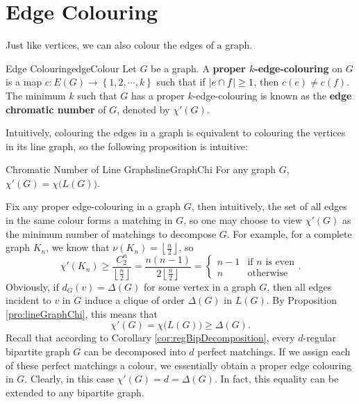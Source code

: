 \documentclass[math, code]{amznotes}
\theoremstyle{remark}
\begin{document}
\section{Edge Colouring}
Just like vertices, we can also colour the edges of a graph. 
\begin{dfnbox}{Edge Colouring}{edgeColour}
    Let $G$ be a graph. A {\color{red} \textbf{proper $k$-edge-colouring}} on $G$ is a map $c \colon E(G) \to \left\{1, 2, \cdots, k\right\}$ such that if ${\left\lvert {e \cap f} \right\rvert} \geq 1$, then $c(e) \neq c(f)$. The minimum $k$ such that $G$ has a proper $k$-edge-colouring is known as the {\color{red} \textbf{edge chromatic number}} of $G$, denoted by $\chi'(G)$.
\end{dfnbox}
Intuitively, colouring the edges in a graph is equivalent to colouring the vertices in its line graph, so the following proposition is intuitive:
\begin{probox}{Chromatic Number of Line Graphs}{lineGraphChi}
    For any graph $G$, $\chi'(G) = \chi\bigl(L(G)\bigr)$.
\end{probox}
Fix any proper edge-colouring in a graph $G$, then intuitively, the set of all edges in the same colour forms a matching in $G$, so one may choose to view $\chi'(G)$ as the minimum number of matchings to decompose $G$. For example, for a complete graph $K_n$, we know that $\nu(K_n) = \left\lfloor\frac{n}{2}\right\rfloor$, so 
\begin{equation*}
    \chi'(K_n) \geq \frac{C^n_2}{\left\lfloor\frac{n}{2}\right\rfloor} = \frac{n(n - 1)}{2\left\lfloor\frac{n}{2}\right\rfloor} = \begin{cases}
        n - 1 & \textrm{if } n \textrm{ is even} \\
        n & \textrm{otherwise}
    \end{cases}.
\end{equation*}
Obviously, if $d_G(v) = \Delta(G)$ for some vertex in a graph $G$, then all edges incident to $v$ in $G$ induce a clique of order $\Delta(G)$ in $L(G)$. By Proposition \ref{pro:lineGraphChi}, this means that 
\begin{equation*}
    \chi'(G) = \chi\bigl(L(G)\bigr) \geq \Delta(G).
\end{equation*}
Recall that according to Corollary \ref{cor:regBipDecomposition}, every $d$-regular bipartite graph $G$ can be decomposed into $d$ perfect matchings. If we assign each of these perfect matchings a colour, we essentially obtain a proper edge colouring in $G$. Clearly, in this case $\chi'(G) = d = \Delta(G)$. In fact, this equality can be extended to any bipartite graph.
\end{document}
